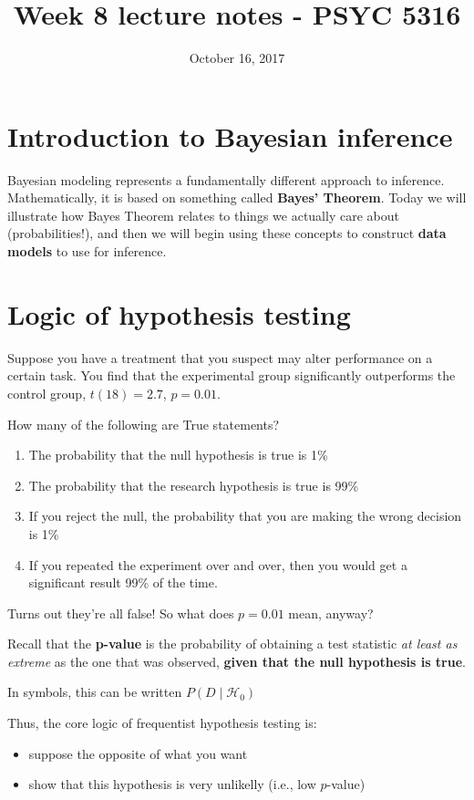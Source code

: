 \documentclass[11pt]{article}
\date{October 16, 2017}
\title{Week 8 lecture notes - PSYC 5316}
\begin{document}
\maketitle

\section*{Introduction to Bayesian inference}
\label{sec-1}

Bayesian modeling represents a fundamentally different approach to inference.  Mathematically, it is based on something called \textbf{Bayes' Theorem}.  Today we will illustrate how Bayes Theorem relates to things we actually care about (probabilities!), and then we will begin using these concepts to construct \textbf{data models} to use for inference.

\section*{Logic of hypothesis testing}
\label{sec-2}
Suppose you have a treatment that you suspect may alter performance on a certain task. You  find that the experimental group significantly outperforms the control group, $t(18) = 2.7$, $p = 0.01$.

How many of the following are True statements?

\begin{enumerate}
\item The probability that the null hypothesis is true is 1\%
\item The probability that the research hypothesis is true is 99\%
\item If you reject the null, the probability that you are making the wrong decision is 1\%
\item If you repeated the experiment over and over, then you would get a significant result 99\% of the time.
\end{enumerate}

Turns out they're all false!  So what does $p=0.01$ mean, anyway?

Recall that the \textbf{p-value} is the probability of obtaining a test statistic \emph{at least as extreme} as the one that was observed, \textbf{given that the null hypothesis is true}.

In symbols, this can be written $P(D\mid \mathcal{H}_0)$

Thus, the core logic of frequentist hypothesis testing is:
\begin{itemize}
\item suppose the opposite of what you want
\item show that this hypothesis is very unlikelly (i.e., low $p$-value)
\end{itemize}
\end{document}
